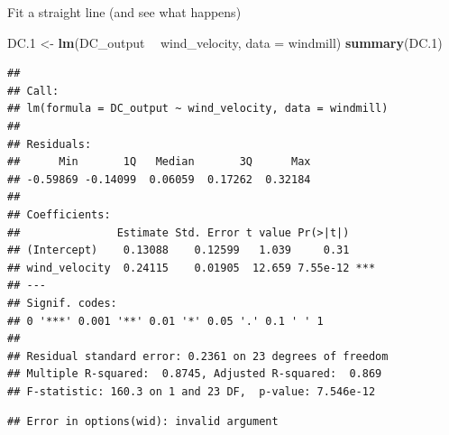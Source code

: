 \documentclass[ignorenonframetext,]{beamer}
\newenvironment{Shaded}{\begin{snugshade}}{\end{snugshade}}
\newcommand{\DataTypeTok}[1]{\textcolor[rgb]{0.13,0.29,0.53}{#1}}
\newcommand{\FloatTok}[1]{\textcolor[rgb]{0.00,0.00,0.81}{#1}}
\newcommand{\KeywordTok}[1]{\textcolor[rgb]{0.13,0.29,0.53}{\textbf{#1}}}
\newcommand{\NormalTok}[1]{#1}
\newcommand{\OperatorTok}[1]{\textcolor[rgb]{0.81,0.36,0.00}{\textbf{#1}}}
\newcommand{\StringTok}[1]{\textcolor[rgb]{0.31,0.60,0.02}{#1}}
\begin{document}
\begin{frame}[fragile]{Fit a straight line (and see what happens)}
\protect\hypertarget{fit-a-straight-line-and-see-what-happens}{}

\footnotesize

\begin{Shaded}
\begin{Highlighting}[]
\NormalTok{DC}\FloatTok{.1}\NormalTok{ <-}\StringTok{ }\KeywordTok{lm}\NormalTok{(DC_output }\OperatorTok{~}\StringTok{ }\NormalTok{wind_velocity, }\DataTypeTok{data =}\NormalTok{ windmill)}
\KeywordTok{summary}\NormalTok{(DC}\FloatTok{.1}\NormalTok{)}
\end{Highlighting}
\end{Shaded}

\begin{verbatim}
## 
## Call:
## lm(formula = DC_output ~ wind_velocity, data = windmill)
## 
## Residuals:
##      Min       1Q   Median       3Q      Max 
## -0.59869 -0.14099  0.06059  0.17262  0.32184 
## 
## Coefficients:
##               Estimate Std. Error t value Pr(>|t|)    
## (Intercept)    0.13088    0.12599   1.039     0.31    
## wind_velocity  0.24115    0.01905  12.659 7.55e-12 ***
## ---
## Signif. codes:  
## 0 '***' 0.001 '**' 0.01 '*' 0.05 '.' 0.1 ' ' 1
## 
## Residual standard error: 0.2361 on 23 degrees of freedom
## Multiple R-squared:  0.8745, Adjusted R-squared:  0.869 
## F-statistic: 160.3 on 1 and 23 DF,  p-value: 7.546e-12
\end{verbatim}

\normalsize

\begin{verbatim}
## Error in options(wid): invalid argument
\end{verbatim}

\end{frame}
\end{document}
